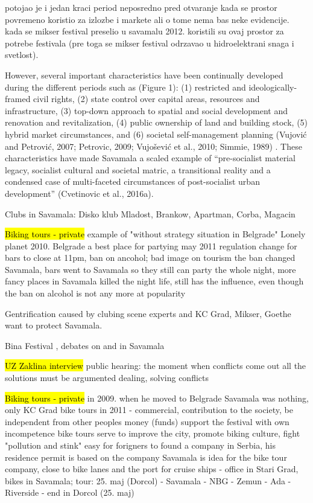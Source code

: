 \documentclass[11pt]{report}
\begin{document}
potojao je i jedan kraci period neposredno pred otvaranje kada se prostor povremeno koristio za izlozbe i markete ali o tome nema bas neke evidencije. kada se mikser festival preselio u savamalu 2012. koristili su ovaj prostor za potrebe festivala (pre toga se mikser festival odrzavao u hidroelektrani snaga i svetlost). 

However, several important characteristics have been continually developed during the different periods such as (Figure 1): (1) restricted and ideologically-framed civil rights, (2) state control over capital areas, resources and infrastructure, (3) top-down approach to spatial and social development and renovation and revitalization, (4) public ownership of land and building stock, (5) hybrid market circumstances, and  (6) societal self-management planning (Vujović and Petrović, 2007; Petrovic, 2009; Vujošević et al., 2010; Simmie, 1989) . These characteristics have made Savamala a scaled example of “pre-socialist material legacy, socialist cultural and societal matric, a transitional reality and a condensed case of multi-faceted circumstances of post-socialist urban development” (Cvetinovic et al., 2016a).

Clubs in Savamala: Disko klub Mladost, Brankow, Apartman, Corba, Magacin

\hl{Biking tours - private}
example of "without strategy situation in Belgrade"
Lonely planet 2010. Belgrade a best place for partying
may 2011 regulation change for bars to close at 11pm, ban on ancohol; bad image on tourism
the ban changed Savamala, bars went to Savamala so they still can party the whole night, more fancy places in Savamala
killed the night life, still has the influence, even though the ban on alcohol is not any more at popularity

Gentrification caused by clubing scene
experts and KC Grad, Mikser, Goethe want to protect Savamala.

Bina Festival , debates on and in Savamala

\hl{UZ Zaklina interview}
public hearing: the moment when conflicts come out
all the solutions must be argumented 
dealing, solving conflicts

\hl{Biking tours - private}
in 2009. when he moved to Belgrade Savamala was nothing, only KC Grad
bike tours in 2011 - commercial, contribution to the society, be independent from other peoples money (funds)
support the festival with own incompetence
bike tours serve to improve the city, promote biking culture, fight "pollution and stink"
easy for forigners to found a company in Serbia, his residence permit is based on the company
Savamala is idea for the bike tour company, close to bike lanes and the port for cruise ships - office in Stari Grad, bikes in Savamala;
tour: 25. maj (Dorcol) - Savamala - NBG - Zemun - Ada - Riverside - end in Dorcol (25. maj)
\end{document}
